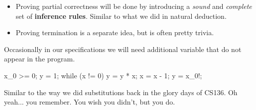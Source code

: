 \begin{itemize}
\item Proving partial correctness will be done by introducing a \emph{sound} and \emph{complete} set of \textbf{inference rules}.  Similar to what we did in natural deduction.
\item Proving termination is a separate idea, but is often pretty trivia.
\end{itemize}

Occasionally in our specifications we will need additional variable that do not appear in the program.\\


\begin{code}[C]
{x_0 >= 0;}
y = 1;
while (x != 0) {
		y = y * x;
		x = x - 1;
}
{y = x_0!;}
\end{code}

Similar to the way we did substitutions back in the glory days of CS136.  Oh yeah... you remember.  You wish you didn't, but you do.\\

